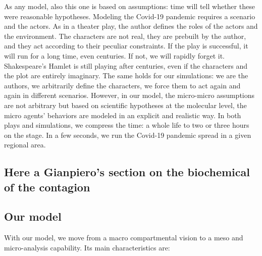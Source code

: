 \documentclass[graybox]{svmult}
\begin{document}
As any model, also this one is based on assumptions: time will tell whether these were reasonable hypotheses. Modeling the Covid-19 pandemic requires a scenario and the actors. As in a theater play, the author defines the roles of the actors and the environment. The characters are not real, they are prebuilt by the author, and they act according to their peculiar constraints. If the play is successful, it will run for a long time, even centuries. If not, we will rapidly forget it. Shakespeare’s Hamlet is still playing after centuries, even if the characters and the plot are entirely imaginary. The same holds for our simulations: we are the authors, we arbitrarily define the characters, we force them to act again and again in different scenarios. However, in our model, the micro-micro assumptions are not arbitrary but based on scientific hypotheses at the molecular level, the micro agents’ behaviors are modeled in an explicit and realistic way. In both plays and simulations, we compress the time: a whole life to two or three hours on the stage. In a few seconds, we run the Covid-19 pandemic spread in a given regional area.



\subsection{Here a Gianpiero's section on the biochemical of the contagion}
\label{biochem}


\subsection{Our model}
\label{ourModel}

With our model, we move from a macro compartmental vision to a meso and micro-analysis capability. Its main characteristics are:
\end{document}
